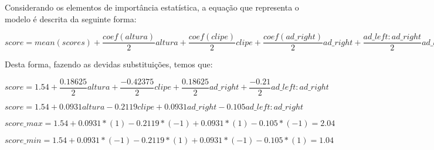 Considerando os elementos de importância estatística, a equação que representa o modelo é descrita da seguinte forma:

\begin{center}
$
  score = mean(scores) + \dfrac{coef(altura)}{2}altura + \dfrac{coef(clipe)}{2}clipe + \dfrac{coef(ad\_right)}{2}ad\_right +  \dfrac{ad\_left:ad\_right}{2}ad\_left:ad\_right
$  
\end{center}

Desta forma, fazendo as devidas substituições, temos que:

\begin{center}
  $
    score = 1.54 + \dfrac{0.18625}{2}altura + \dfrac{-0.42375}{2}clipe + \dfrac{0.18625}{2}ad\_right +  \dfrac{-0.21}{2}ad\_left:ad\_right
  $  

  $ score = 1.54 + 0.0931altura- 0.2119clipe + 0.0931ad\_right - 0.105ad\_left:ad\_right$

  $score\_max =  1.54 + 0.0931*(1)- 0.2119*(-1) + 0.0931*(1) - 0.105*(-1) = 2.04$

  $score\_min =  1.54 + 0.0931*(-1)- 0.2119*(1) + 0.0931*(-1) - 0.105*(1) = 1.04$
  \end{center}
